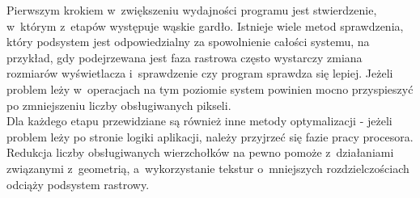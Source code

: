 \documentclass[a4paper,twoside,12pt]{book}
\begin{document}
Pierwszym krokiem w~zwiększeniu wydajności programu jest stwierdzenie, w~którym z~etapów występuje wąskie gardło. Istnieje wiele metod sprawdzenia, który podsystem jest odpowiedzialny za spowolnienie całości systemu, na przykład, gdy podejrzewana jest faza rastrowa często wystarczy zmiana rozmiarów wyświetlacza i~sprawdzenie czy program sprawdza się lepiej. Jeżeli problem leży w~operacjach na tym poziomie system powinien mocno przyspieszyć po zmniejszeniu liczby obsługiwanych pikseli. \\
Dla każdego etapu przewidziane są również inne metody optymalizacji - jeżeli problem leży po stronie logiki aplikacji, należy przyjrzeć się fazie pracy procesora. Redukcja liczby obsługiwanych wierzchołków na pewno pomoże z~działaniami związanymi z~geometrią, a~wykorzystanie tekstur o~mniejszych rozdzielczościach odciąży podsystem rastrowy.
\end{document}
